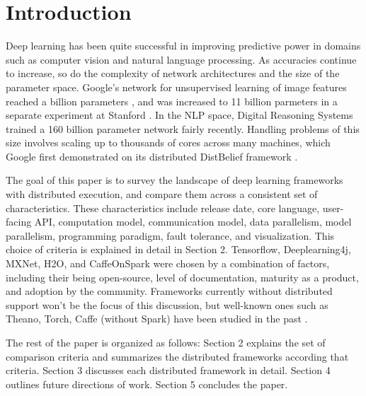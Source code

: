 \section{Introduction}
Deep learning has been quite successful in improving predictive power in domains such as computer vision and natural language processing. As accuracies continue to  increase, so do the complexity of network architectures and the size of the parameter space. Google's network for unsupervised learning of image features reached a billion parameters \cite{donahue2014decaf}, and was increased to 11 billion parmeters in a separate experiment at Stanford \cite{schmidhuber2015deep}. In the NLP space, Digital Reasoning Systems trained a 160 billion parameter network \cite{trask2015modeling} fairly recently. Handling problems of this size involves scaling up to thousands of cores across many machines, which Google first demonstrated on its distributed DistBelief framework \cite{dean2012large}.

The goal of this paper is to survey the landscape of deep learning frameworks with distributed execution, and compare them across a consistent set of characteristics. These characteristics include release date, core language, user-facing API, computation model, communication model, data parallelism, model parallelism, programming paradigm, fault tolerance, and visualization. This choice of criteria is explained in detail in Section 2. Tensorflow, Deeplearning4j, MXNet, H2O, and CaffeOnSpark were chosen by a combination of factors, including their being open-source, level of documentation, maturity as a product, and adoption by the community. Frameworks currently without distributed support won't be the focus of this discussion, but well-known ones such as Theano, Torch, Caffe (without Spark) have been studied in the past \cite{DBLP:journals/corr/BahrampourRSS15}. 

The rest of the paper is organized as follows: Section 2 explains the set of comparison criteria and summarizes the distributed frameworks according that criteria. Section 3 discusses each distributed framework in detail. Section 4 outlines future directions of work. Section 5 concludes the paper.

